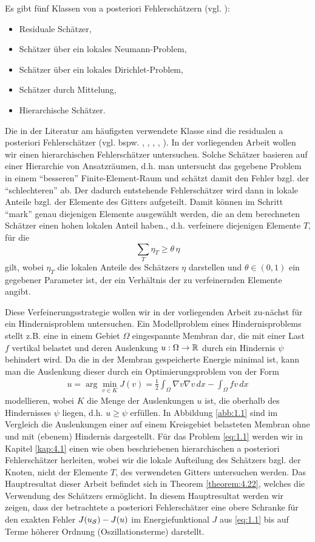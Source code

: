 Es gibt fünf Klassen von a posteriori Fehlerschätzern (vgl. \cite{BraeFEM}):
\begin{itemize}
\item Residuale Schätzer,
\item Schätzer über ein lokales Neumann-Problem,
\item Schätzer über ein lokales Dirichlet-Problem,
\item Schätzer durch Mittelung,
\item Hierarchische Schätzer.
\end{itemize}
Die in der Literatur  am häufigsten verwendete Klasse sind die residualen a posteriori Fehlerschätzer (vgl. bspw. \cite{BraeFEM}, \cite{BraeLook}, \cite{BraeCar}, \cite{BraeCar2}, \cite{MorNoc}). In der vorliegenden Arbeit wollen wir einen hierarchischen Fehlerschätzer untersuchen. Solche Schätzer basieren auf einer Hierarchie von Ansatzräumen, d.h. man untersucht das gegebene Problem in einem "`besseren"' Finite-Element-Raum und schätzt damit den Fehler bzgl. der "`schlechteren"'  ab. Der dadurch entstehende  Fehlerschätzer  wird dann in lokale Anteile bzgl. der Elemente des Gitters aufgeteilt. Damit können im Schritt "`mark"'  genau diejenigen Elemente ausgewählt werden, die an dem berechneten Schätzer einen hohen lokalen Anteil haben., d.h. verfeinere diejenigen Elemente $T$, für die
\[
	\sum_{T} \eta_T \ge \theta\, \eta 
\]
gilt, wobei $\eta_T$ die lokalen Anteile des Schätzers $\eta$ darstellen und $\theta \in (0,1)$ ein gegebener Parameter ist, der ein Verhältnis der zu verfeinernden Elemente angibt.

Diese Verfeinerungsstrategie wollen wir in der vorliegenden Arbeit zu-nächst für ein Hindernisproblem untersuchen. Ein Modellproblem eines Hindernisproblems stellt z.B. eine in einem Gebiet $\Omega$ eingespannte Membran dar, die mit einer Last $f$ vertikal belastet und deren Auslenkung $u: \Omega \rightarrow \mathbb{R}$ durch ein Hindernis $\psi$ behindert wird. Da die in der Membran gespeicherte Energie minimal ist, kann man die Auslenkung dieser durch ein Optimierungsproblem von der Form
\begin{align}\label{eq:1.1}
	u = \arg\min_{v \in K} J(v) = \frac 12 \int_{\Omega} \nabla v \nabla v \, dx - \int_\Omega f v \, dx
\end{align}
modellieren, wobei $K$ die Menge der Auslenkungen $u$ ist, die oberhalb des Hindernisses $\psi$ liegen, d.h. $u\ge \psi$ erfüllen.  In Abbildung \ref{abb:1.1} sind im Vergleich die Auslenkungen einer auf einem Kreisgebiet belasteten Membran ohne und mit (ebenem) Hindernis dargestellt. Für das Problem \eqref{eq:1.1} werden wir in Kapitel \ref{kap:4.1} einen wie oben beschriebenen hierarchischen a posteriori Fehlerschätzer herleiten, wobei wir die lokale Aufteilung des Schätzers bzgl. der Knoten, nicht der Elemente $T$, des verwendeten Gitters untersuchen werden. Das Hauptresultat dieser Arbeit befindet sich in Theorem \ref{theorem:4.22}, welches  die Verwendung des Schätzers ermöglicht. In diesem Hauptresultat werden wir zeigen, dass der betrachtete a posteriori Fehlerschätzer eine obere Schranke für den exakten Fehler $J(u_{\mathcal S}) - J(u)$ im Energiefunktional $J$ aus \eqref{eq:1.1} bis auf Terme höherer Ordnung (Oszillationsterme) darstellt.

